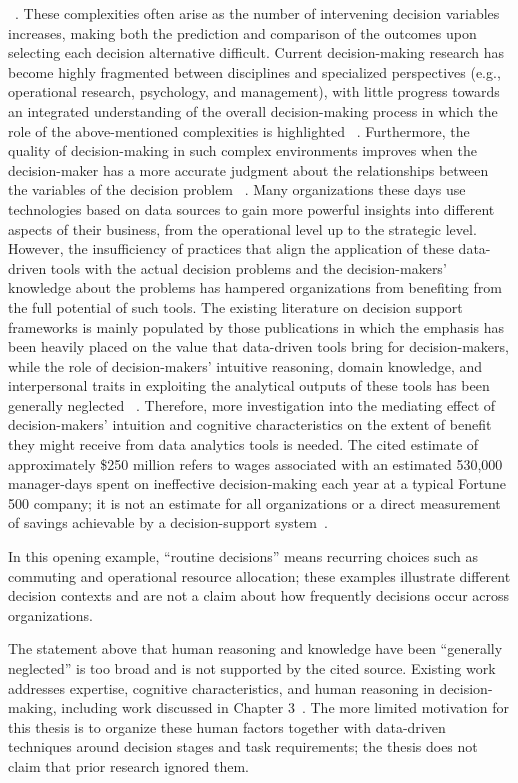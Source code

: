 \documentclass{sfuthesis}
\begin{document}
~\cite{smet_three_nodate}. These complexities often arise as the number of intervening decision variables increases, making both the prediction and comparison of the outcomes upon selecting each decision alternative difficult. Current decision-making research has become highly fragmented between disciplines and specialized perspectives (e.g., operational research, psychology, and management), with little progress towards an integrated understanding of the overall decision-making process in which the role of the above-mentioned complexities is highlighted ~\cite{adinolfi2021journey}. Furthermore, the quality of decision-making in such complex environments improves when the decision-maker has a more accurate judgment about the relationships between the variables of the decision problem ~\cite{janssen2017factors}. Many organizations these days use technologies based on data sources to gain more powerful insights into different aspects of their business, from the operational level up to the strategic level. However, the insufficiency of practices that align the application of these data-driven tools with the actual decision problems and the decision-makers' knowledge about the problems has hampered organizations from benefiting from the full potential of such tools. The existing literature on decision support frameworks is mainly populated by those publications in which the emphasis has been heavily placed on the value that data-driven tools bring for decision-makers, while the role of decision-makers’ intuitive reasoning, domain knowledge, and interpersonal traits in exploiting the analytical outputs of these tools has been generally neglected ~\cite{janssen2017factors}. Therefore, more investigation into the mediating effect of decision-makers’ intuition and cognitive characteristics on the extent of benefit they might receive from data analytics tools is needed.
The cited estimate of approximately \$250 million refers to wages associated with an estimated 530,000 manager-days spent on ineffective decision-making each year at a typical Fortune 500 company; it is not an estimate for all organizations or a direct measurement of savings achievable by a decision-support system~\cite{smet_three_nodate}.\par
In this opening example, “routine decisions” means recurring choices such as commuting and operational resource allocation; these examples illustrate different decision contexts and are not a claim about how frequently decisions occur across organizations.\par
The statement above that human reasoning and knowledge have been “generally neglected” is too broad and is not supported by the cited source. Existing work addresses expertise, cognitive characteristics, and human reasoning in decision-making, including work discussed in Chapter 3~\cite{eberhard_effects_2023,klein1997developing,dror_cognitive_2020,zaimoglu2023epistemological}. The more limited motivation for this thesis is to organize these human factors together with data-driven techniques around decision stages and task requirements; the thesis does not claim that prior research ignored them.\par
\end{document}
